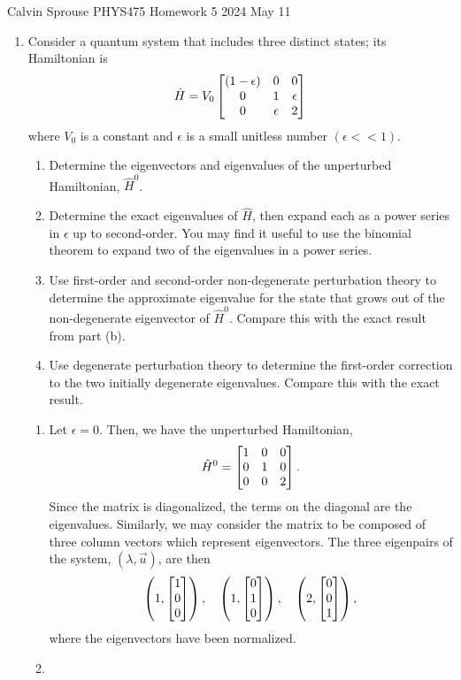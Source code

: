 \documentclass[a4paper, 12pt]{config/homework}
\begin{document}
\noindent
Calvin Sprouse \hfill PHYS475 Homework 5 \hfill 2024 May 11
\bigskip

\begin{enumerate}
\item Consider a quantum system that includes three distinct states; its Hamiltonian is
\[\hat{H} = V_0 \left[ \begin{matrix} (1-\epsilon) & 0 & 0 \\ 0 & 1 & \epsilon \\ 0 & \epsilon & 2 \end{matrix} \right]\]
where \(V_0\) is a constant and \(\epsilon\) is a small unitless number \(\left(\epsilon << 1\right)\).
\begin{enumerate}[label=(\alph*)]
\item Determine the eigenvectors and eigenvalues of the unperturbed Hamiltonian, \(\hat{H}^0\).
\item Determine the exact eigenvalues of \(\hat{H}\), then expand each as a power series in \(\epsilon\) up to second-order. You may find it useful to use the binomial theorem to expand two of the eigenvalues in a power series.
\item Use first-order and second-order non-degenerate perturbation theory to determine the approximate eigenvalue for the state that grows out of the non-degenerate eigenvector of \(\hat{H}^0\). Compare this with the exact result from part (b).
\item Use degenerate perturbation theory to determine the first-order correction to the two initially degenerate eigenvalues. Compare this with the exact result.
\end{enumerate}
\bigskip
\begin{enumerate}[label=(\alph*)]
\item Let \(\epsilon = 0\). Then, we have the unperturbed Hamiltonian,
\[\hat{H}^0 = \left[ \begin{matrix} 1 & 0 & 0 \\ 0 & 1 & 0 \\ 0 & 0 & 2 \end{matrix} \right].\]
Since the matrix is diagonalized, the terms on the diagonal are the eigenvalues. Similarly, we may consider the matrix to be composed of three column vectors which represent eigenvectors. The three eigenpairs of the system, \(\left(\lambda, \vec{u}\right)\), are then
\[  \left(1, \left[ \begin{matrix} 1 \\ 0 \\ 0 \end{matrix} \right]\right), \quad
    \left(1, \left[ \begin{matrix} 0 \\ 1 \\ 0 \end{matrix} \right]\right), \quad
    \left(2, \left[ \begin{matrix} 0 \\ 0 \\ 1 \end{matrix} \right]\right), \]
where the eigenvectors have been normalized.

\pagebreak
\item 
\end{enumerate}
\end{enumerate}
\end{document}
